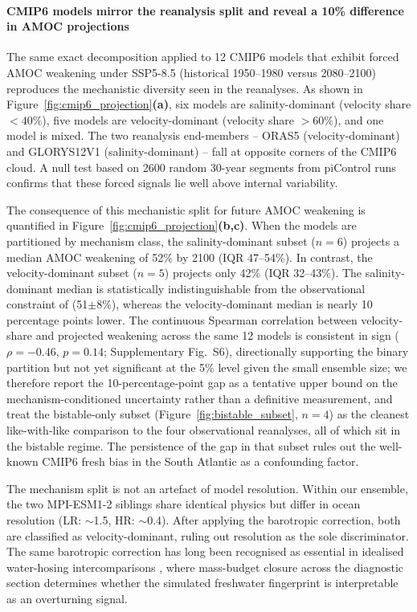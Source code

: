 \documentclass[11pt,a4paper]{article}
\begin{document}
\paragraph*{CMIP6 models mirror the reanalysis split and reveal a 10\% difference in AMOC projections}

The same exact decomposition applied to 12 CMIP6 models that exhibit forced AMOC weakening under SSP5-8.5 (historical 1950--1980 versus 2080--2100) reproduces the mechanistic diversity seen in the reanalyses. As shown in Figure~\ref{fig:cmip6_projection}\textbf{(a)}, six models are salinity-dominant (velocity share \(<40\%\)), five models are velocity-dominant (velocity share \(>60\%\)), and one model is mixed. The two reanalysis end-members -- ORAS5 (velocity-dominant) and GLORYS12V1 (salinity-dominant) -- fall at opposite corners of the CMIP6 cloud. A null test based on 2600 random 30-year segments from piControl runs confirms that these forced signals lie well above internal variability.

The consequence of this mechanistic split for future AMOC weakening is quantified in Figure~\ref{fig:cmip6_projection}\textbf{(b,c)}. When the models are partitioned by mechanism class, the salinity-dominant subset (\(n=6\)) projects a median AMOC weakening of 52\% by 2100 (IQR 47--54\%). In contrast, the velocity-dominant subset (\(n=5\)) projects only 42\% (IQR 32--43\%). The salinity-dominant median is statistically indistinguishable from the observational constraint of \citet{Portmann2026} (51\(\pm\)8\%), whereas the velocity-dominant median is nearly 10 percentage points lower. The continuous Spearman correlation between velocity-share and projected weakening across the same 12 models is consistent in sign ($\rho = -0.46$, $p = 0.14$; Supplementary Fig.~S6), directionally supporting the binary partition but not yet significant at the 5\% level given the small ensemble size; we therefore report the 10-percentage-point gap as a tentative upper bound on the mechanism-conditioned uncertainty rather than a definitive measurement, and treat the bistable-only subset (Figure~\ref{fig:bistable_subset}, $n=4$) as the cleanest like-with-like comparison to the four observational reanalyses, all of which sit in the bistable regime. The persistence of the gap in that subset rules out the well-known CMIP6 fresh bias in the South Atlantic as a confounding factor.

The mechanism split is not an artefact of model resolution. Within our ensemble, the two MPI-ESM1-2 siblings share identical physics but differ in ocean resolution (LR: $\sim$1.5\textdegree, HR: $\sim$0.4\textdegree). After applying the barotropic correction, both are classified as velocity-dominant, ruling out resolution as the sole discriminator. The same barotropic correction has long been recognised as essential in idealised water-hosing intercomparisons \citep{Stouffer2006}, where mass-budget closure across the diagnostic section determines whether the simulated freshwater fingerprint is interpretable as an overturning signal.
\end{document}
